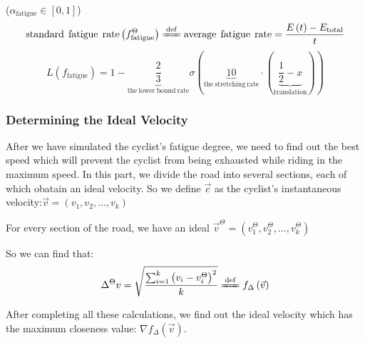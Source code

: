 \documentclass[12pt]{article}
\theoremstyle{definition}
\theoremstyle{remark}
\numberwithin{equation}{section}
\begin{document}
     ($\alpha _{\mathrm{fatigue}}\in \left[ 0,1 \right] $)
     $$\mathrm{standard}\:\:\mathrm{fatigue}\:\:\mathrm{rate}\left( f_{\mathrm{fatigue}}^{\Theta} \right) \xlongequal{\mathrm{def}}\mathrm{average}\:\:\mathrm{fatigue}\:\:\mathrm{rate}=\dfrac{E\left( t \right) -E_{\mathrm{total}}}{t}
      $$
    $$L\left( f_{\mathrm{fatigue}} \right) =1-\underset{\mathrm{the}\:\mathrm{lower}\:\mathrm{bound}\:\mathrm{rate}}{\underbrace{\dfrac{2}{3}}}\sigma \left( \underset{\mathrm{the}\:\mathrm{stretching}\:\mathrm{rate}}{\underbrace{10}}\cdot \left( \underset{\mathrm{translation}}{\underbrace{\dfrac{1}{2}-x}} \right) \right) $$
     \subsubsection{Determining the Ideal Velocity}
	 After we have simulated the cyclist's fatigue degree, we need to find out the best speed which will prevent the cyclist from being exhausted while riding in the maximum speed. In this part, we divide the road into several sections, each of which obatain an ideal velocity. So we define $\vec{c}$ as the cyclist's instantaneous velocity:$\vec{v}=\left( v_1,v_2,...,v_k \right)$ 
	
	 For every section of the road, we have an ideal $\vec{v}^{\Theta}=\left( v_{1}^{\Theta},v_{2}^{\Theta},...,v_{k}^{\Theta} \right) $
	
	 So we can find that:
	$$\Delta ^{\Theta}v=\sqrt{\frac{\sum_{i=1}^k{\left( v_i-v_{i}^{\Theta} \right) ^2}}{k}}\xlongequal{\mathrm{def}}f_{\Delta}\left( \vec{v} \right) $$
	
	After completing all these calculations, we find out the ideal velocity which has the maximum closeness value: $\nabla f_{\Delta}\left( \vec{v} \right) $.
\end{document}
